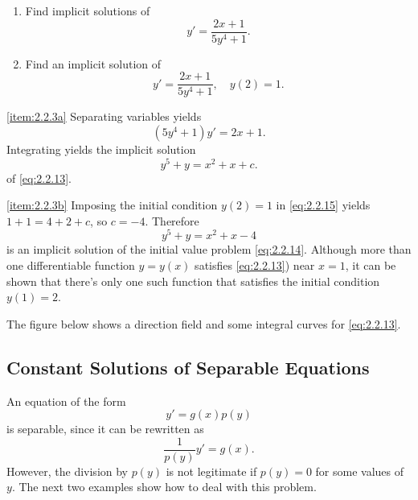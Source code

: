 \documentclass{ximera}
\begin{document}
\begin{example}\label{example:2.2.3}
\begin{enumerate}
\item\label{item:2.2.3a}
Find implicit solutions of
\begin{equation} \label{eq:2.2.13}
y'=\frac{2x+1}{5y^4+1}.
\end{equation}
\item\label{item:2.2.3b}
Find an implicit solution of
\begin{equation} \label{eq:2.2.14}
y'=\frac{2x+1}{5y^4+1},\quad y(2)=1.
\end{equation}
\end{enumerate}
 
\begin{explanation}
\ref{item:2.2.3a}
 Separating variables yields
$$
(5y^4+1)y'=2x+1.
$$
Integrating yields the implicit solution
\begin{equation} \label{eq:2.2.15}
y^5+y=x^2+x+ c.
\end{equation}
of \eqref{eq:2.2.13}.
 
\ref{item:2.2.3b} Imposing the initial condition $y(2)=1$ in
\eqref{eq:2.2.15} yields $1+1=4+2+c$, so $c=-4$. Therefore
$$
y^5+y=x^2+x-4
$$
is an implicit solution of the initial value problem \eqref{eq:2.2.14}.
Although more than one differentiable function $y=y(x)$ satisfies
\ref{eq:2.2.13}) near $x=1$, it can be shown that there's only
one such function that satisfies the initial condition $y(1)=2$.
 
The figure below shows a direction field and some integral curves
for \eqref{eq:2.2.13}.

\begin{center}
\end{center}
 
 
\end{explanation}
\end{example}
 
\subsection*{Constant Solutions of Separable Equations}
 
An equation of the form
$$
y'=g(x)p(y)
$$
 is separable, since it can be rewritten as
$$
\frac{1}{p(y)}y'=g(x).
$$
 However, the division by  $p(y)$
is not legitimate  if $p(y)=0$ for some values of $y$.  The
next two examples show how to deal with this problem.
 
\end{document}
